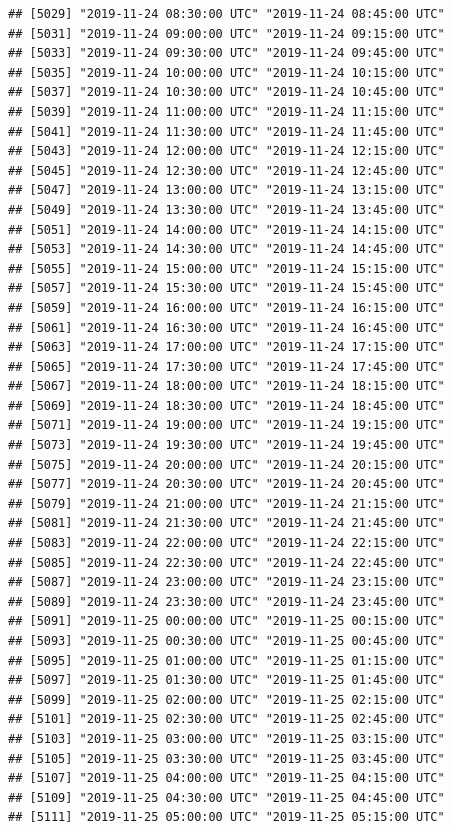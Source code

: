 \documentclass{article}\usepackage[]{graphicx}\usepackage[]{color}
\makeatletter
\newenvironment{kframe}{%
 \def\at@end@of@kframe{}%
 \ifinner\ifhmode%
  \def\at@end@of@kframe{\end{minipage}}%
  \begin{minipage}{\columnwidth}%
 \fi\fi%
 \def\FrameCommand##1{\hskip\@totalleftmargin \hskip-\fboxsep
 \colorbox{shadecolor}{##1}\hskip-\fboxsep
     \hskip-\linewidth \hskip-\@totalleftmargin \hskip\columnwidth}%
 \MakeFramed {\advance\hsize-\width
   \@totalleftmargin\z@ \linewidth\hsize
   \@setminipage}}%
 {\par\unskip\endMakeFramed%
 \at@end@of@kframe}
\newenvironment{knitrout}{}{} %
\makeatother
\begin{document}
\begin{knitrout}
\begin{kframe}
\begin{verbatim}
## [5029] "2019-11-24 08:30:00 UTC" "2019-11-24 08:45:00 UTC"
## [5031] "2019-11-24 09:00:00 UTC" "2019-11-24 09:15:00 UTC"
## [5033] "2019-11-24 09:30:00 UTC" "2019-11-24 09:45:00 UTC"
## [5035] "2019-11-24 10:00:00 UTC" "2019-11-24 10:15:00 UTC"
## [5037] "2019-11-24 10:30:00 UTC" "2019-11-24 10:45:00 UTC"
## [5039] "2019-11-24 11:00:00 UTC" "2019-11-24 11:15:00 UTC"
## [5041] "2019-11-24 11:30:00 UTC" "2019-11-24 11:45:00 UTC"
## [5043] "2019-11-24 12:00:00 UTC" "2019-11-24 12:15:00 UTC"
## [5045] "2019-11-24 12:30:00 UTC" "2019-11-24 12:45:00 UTC"
## [5047] "2019-11-24 13:00:00 UTC" "2019-11-24 13:15:00 UTC"
## [5049] "2019-11-24 13:30:00 UTC" "2019-11-24 13:45:00 UTC"
## [5051] "2019-11-24 14:00:00 UTC" "2019-11-24 14:15:00 UTC"
## [5053] "2019-11-24 14:30:00 UTC" "2019-11-24 14:45:00 UTC"
## [5055] "2019-11-24 15:00:00 UTC" "2019-11-24 15:15:00 UTC"
## [5057] "2019-11-24 15:30:00 UTC" "2019-11-24 15:45:00 UTC"
## [5059] "2019-11-24 16:00:00 UTC" "2019-11-24 16:15:00 UTC"
## [5061] "2019-11-24 16:30:00 UTC" "2019-11-24 16:45:00 UTC"
## [5063] "2019-11-24 17:00:00 UTC" "2019-11-24 17:15:00 UTC"
## [5065] "2019-11-24 17:30:00 UTC" "2019-11-24 17:45:00 UTC"
## [5067] "2019-11-24 18:00:00 UTC" "2019-11-24 18:15:00 UTC"
## [5069] "2019-11-24 18:30:00 UTC" "2019-11-24 18:45:00 UTC"
## [5071] "2019-11-24 19:00:00 UTC" "2019-11-24 19:15:00 UTC"
## [5073] "2019-11-24 19:30:00 UTC" "2019-11-24 19:45:00 UTC"
## [5075] "2019-11-24 20:00:00 UTC" "2019-11-24 20:15:00 UTC"
## [5077] "2019-11-24 20:30:00 UTC" "2019-11-24 20:45:00 UTC"
## [5079] "2019-11-24 21:00:00 UTC" "2019-11-24 21:15:00 UTC"
## [5081] "2019-11-24 21:30:00 UTC" "2019-11-24 21:45:00 UTC"
## [5083] "2019-11-24 22:00:00 UTC" "2019-11-24 22:15:00 UTC"
## [5085] "2019-11-24 22:30:00 UTC" "2019-11-24 22:45:00 UTC"
## [5087] "2019-11-24 23:00:00 UTC" "2019-11-24 23:15:00 UTC"
## [5089] "2019-11-24 23:30:00 UTC" "2019-11-24 23:45:00 UTC"
## [5091] "2019-11-25 00:00:00 UTC" "2019-11-25 00:15:00 UTC"
## [5093] "2019-11-25 00:30:00 UTC" "2019-11-25 00:45:00 UTC"
## [5095] "2019-11-25 01:00:00 UTC" "2019-11-25 01:15:00 UTC"
## [5097] "2019-11-25 01:30:00 UTC" "2019-11-25 01:45:00 UTC"
## [5099] "2019-11-25 02:00:00 UTC" "2019-11-25 02:15:00 UTC"
## [5101] "2019-11-25 02:30:00 UTC" "2019-11-25 02:45:00 UTC"
## [5103] "2019-11-25 03:00:00 UTC" "2019-11-25 03:15:00 UTC"
## [5105] "2019-11-25 03:30:00 UTC" "2019-11-25 03:45:00 UTC"
## [5107] "2019-11-25 04:00:00 UTC" "2019-11-25 04:15:00 UTC"
## [5109] "2019-11-25 04:30:00 UTC" "2019-11-25 04:45:00 UTC"
## [5111] "2019-11-25 05:00:00 UTC" "2019-11-25 05:15:00 UTC"

\end{verbatim}
\end{kframe}
\end{knitrout}
\end{document}
